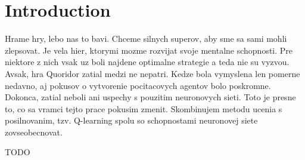 \chapter{Introduction}\label{chap:1}

Hrame hry, lebo nas to bavi. Chceme silnych superov, aby sme sa sami mohli
zlepsovat. Je vela hier, ktorymi mozme rozvijat svoje mentalne schopnosti.
Pre niektore z nich vsak uz boli najdene optimalne strategie a teda nie su
vyzvou.
Avsak, hra Quoridor zatial medzi ne nepatri. Kedze bola vymyslena len
pomerne nedavno, aj pokusov o vytvorenie pocitacovych agentov bolo poskromne.
Dokonca, zatial neboli ani uspechy s pouzitim neuronovych sieti.
Toto je presne to, co sa vramci tejto prace pokusim zmenit. Skombinujem
metodu ucenia s posilnovanim, tzv. Q-learning spolu so schopnostami neuronovej
siete zovseobecnovat.

TODO

